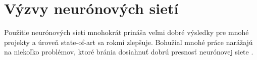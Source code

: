 %
%
%
%


\section{Výzvy neurónových sietí}
Použitie neurónových sieti mnohokrát prináša veľmi dobré výsledky pre mnohé projekty a úroveň state-of-art sa rokmi zlepšuje. Bohužiaľ mnohé práce narážajú na niekoľko problémov, ktoré bránia dosiahnuť dobrú presnosť neurónovej siete \cite{RosinPaulL2019RIAa}.

